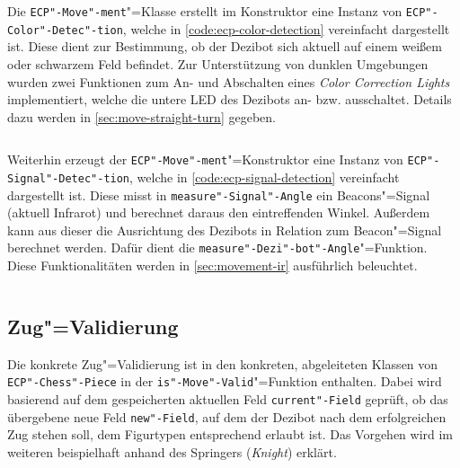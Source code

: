 
Die \texttt{ECP"-Move"-ment}"=Klasse erstellt im Konstruktor eine Instanz von \texttt{ECP"-Color"-Detec"-tion}, welche in \autoref{code:ecp-color-detection} vereinfacht dargestellt ist. Diese dient zur Bestimmung, ob der Dezibot sich aktuell auf einem weißem oder schwarzem Feld befindet. Zur Unterstützung von dunklen Umgebungen wurden zwei Funktionen zum An- und Abschalten eines \emph{Color Correction Lights} implementiert, welche die untere LED des Dezibots an- bzw. ausschaltet. Details dazu werden in \autoref{sec:move-straight-turn} gegeben.

\begin{listing}[h]
    \inputminted{cpp}{../assets/code/ECPColorDetection.cpp}
    \caption{Vereinfachter Code"=Ausschnitt zur \texttt{ECP"-Color"-Detec"-tion}"=Klasse}
    \label{code:ecp-color-detection}
\end{listing}


Weiterhin erzeugt der \texttt{ECP"-Move"-ment}"=Konstruktor eine Instanz von \texttt{ECP"-Signal"-Detec"-tion}, welche in \autoref{code:ecp-signal-detection} vereinfacht dargestellt ist. Diese misst in \texttt{measure"-Signal"-Angle} ein Beacons"=Signal (aktuell Infrarot) und berechnet daraus den eintreffenden Winkel. Außerdem kann aus dieser die Ausrichtung des Dezibots in Relation zum Beacon"=Signal berechnet werden. Dafür dient die \texttt{measure"-Dezi"-bot"-Angle}"=Funktion. Diese Funktionalitäten werden in \autoref{sec:movement-ir} ausführlich beleuchtet.

\begin{listing}[h]
    \inputminted{cpp}{../assets/code/ECPSignalDetection.cpp}
    \caption{Vereinfachter Code"=Ausschnitt zur \texttt{ECP"-Signal"-Detec"-tion}"=Klasse}
    \label{code:ecp-signal-detection}
\end{listing}


\subsection{Zug"=Validierung}
\label{sec:move-validation}

Die konkrete Zug"=Validierung ist in den konkreten, abgeleiteten Klassen von \texttt{ECP"-Chess"-Piece} in der \texttt{is"-Move"-Valid}"=Funktion enthalten. Dabei wird basierend auf dem gespeicherten aktuellen Feld \texttt{current"-Field} geprüft, ob das übergebene neue Feld \texttt{new"-Field}, auf dem der Dezibot nach dem erfolgreichen Zug stehen soll, dem Figurtypen entsprechend erlaubt ist. Das Vorgehen wird im weiteren beispielhaft anhand des Springers (\emph{Knight}) erklärt.

